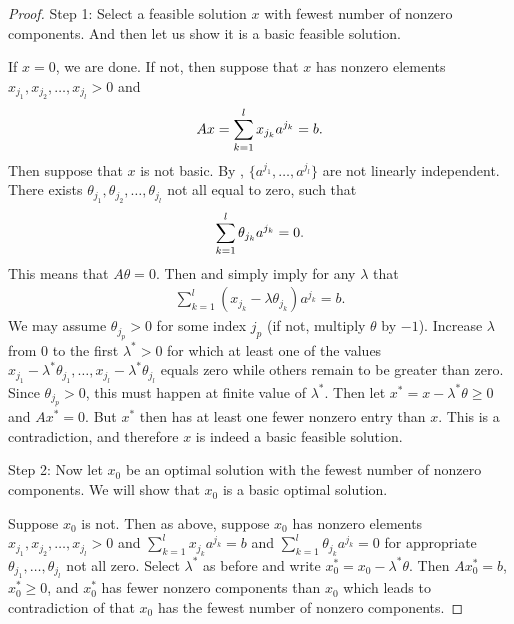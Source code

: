 \begin{proof}
Step 1:
Select a feasible solution $x$ with fewest number of nonzero components.
And then let us show it is a basic feasible solution.

If $x=0$, we are done.
If not, then suppose that $x$ has nonzero elements $x_{j_1}, x_{j_2}, \dots, x_{j_l} > 0$ and 
\begin{align}
Ax = \sum _{k=1}^{l} x_{j_k}a^{j_k} = b. \labeq{proof_basic_sol_1}
\end{align}
Then suppose that $x$ is not basic. 
By , $\{ a^{j_1},\dots, a^{j_l} \}$ are not linearly independent.
There exists $\theta_{j_1}, \theta_{j_2}, \dots, \theta_{j_l}$ not all equal to zero, such that
\begin{align}
\sum_{k=1}^{l} \theta_{j_k} a^{j_k} = 0. \labeq{proof_basic_sol_2}
\end{align}
This means that $A\theta = 0$.
Then  and  simply imply for any $\lambda$ that
\begin{align}
\sum _{k=1}^{l} (x_{j_k} - \lambda \theta_{j_k}) a^{j_k} = b.
\end{align}
We may assume $\theta_{j_p} > 0$ for some index $j_p$ (if not, multiply $\theta$ by $-1$).
Increase $\lambda$ from $0$ to the first $\lambda^*>0$ for which at least one of the values $x_{j_1} - \lambda^* \theta_{j_1}, \dots, x_{j_l} - \lambda^* \theta_{j_l}$ equals zero while others remain to be greater than zero.
Since $\theta_{j_p}>0$, this must happen at finite value of $\lambda^*$.
Then let $x^* = x - \lambda^* \theta \ge 0$ and $A x^* = 0$.
But $x^*$ then has at least one fewer nonzero entry than $x$.
This is a contradiction, and therefore $x$ is indeed a basic feasible solution.

Step 2:
Now let $x_0$ be an optimal solution with the fewest number of nonzero components. 
We will show that $x_0$ is a basic optimal solution.

Suppose $x_0$ is not.
Then as above, suppose $x_0$ has nonzero elements $x_{j_1}, x_{j_2}, \dots, x_{j_l} > 0$ and $\sum _{k=1}^{l} x_{j_k}a^{j_k} = b$ and $\sum_{k=1}^{l} \theta_{j_k} a^{j_k} = 0$ for appropriate $\theta_{j_1}, \dots, \theta_{j_l}$ not all zero.
Select $\lambda^*$ as before and write $x_0^* = x_0 - \lambda^* \theta$.
Then $A x_0^* = b$, $x_0^* \ge 0$, and $x_0^*$ has fewer nonzero components than $x_0$ which leads to contradiction of that $x_0$ has the fewest number of nonzero components.


\end{proof}
